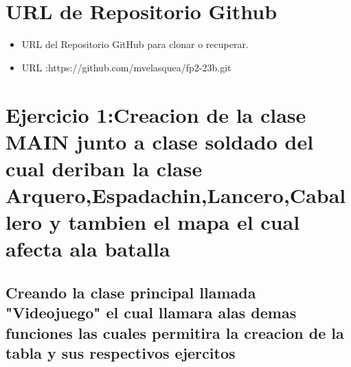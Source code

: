 \documentclass{article}
\begin{document}
	\section{URL de Repositorio Github}
	\begin{itemize}
		\item URL del Repositorio GitHub para clonar o recuperar.
			\item URL :https://github.com/mvelasquea/fp2-23b.git

	\end{itemize}
	
	\section{Ejercicio 1:Creacion de la clase MAIN junto a clase soldado del cual deriban  la clase Arquero,Espadachin,Lancero,Caballero  y tambien el mapa el cual afecta ala batalla}
	
	\subsection{Creando la clase principal llamada "Videojuego" el cual llamara alas demas funciones las cuales permitira la creacion de la tabla y sus respectivos ejercitos}
		
\end{document}
